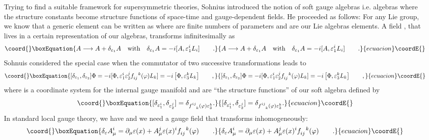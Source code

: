 \documentclass[a4paper,12pt]{book}
\begin{document}
Trying to find a suitable framework for supersymmetric theories, Sohnius
introduced the notion of soft gauge algebras i.e. algebras where the
structure constants become structure functions of space-time and
gauge-dependent fields. He proceeded as follows: For any Lie group, we know
that a generic element can be written as \coordHE{} where 
\myHighlight{$\varepsilon $}\coordHE{} are finite numbers of parameters and \coordHE{} are our Lie
algebras elements. A field \coordHE{}, that lives in a certain representation of
our algebras, transforms infinitesimally as 
\begin{equation}\coord{}\boxEquation{
A\longrightarrow A+\delta _{\varepsilon _{1}}A\quad \mbox{with}\quad \delta
_{\varepsilon _{1}}A=-i[A,\varepsilon _{1}^{i}L_{i}]\qquad .
}{
A\longrightarrow A+\delta _{\varepsilon _{1}}A\quad \mbox{with}\quad \delta
_{\varepsilon _{1}}A=-i[A,\varepsilon _{1}^{i}L_{i}]\qquad .
}{ecuacion}\coordE{}\end{equation}
Sohnuis considered the special case when the commutator of two successive
transformations leads to 
\begin{equation}\coord{}\boxEquation{
\lbrack \delta _{\varepsilon _{1}},\delta _{\varepsilon _{2}}]\Phi =-i[\Phi
,\varepsilon _{1}^{i}\varepsilon _{2}^{j}f_{ij}^{\ \ k}(\varphi
)L_{k}]=-i\left[ \Phi ,\varepsilon _{3}^{k}L_{k}\right] \qquad ,
}{
\lbrack \delta _{\varepsilon _{1}},\delta _{\varepsilon _{2}}]\Phi =-i[\Phi
,\varepsilon _{1}^{i}\varepsilon _{2}^{j}f_{ij}^{\ \ k}(\varphi
)L_{k}]=-i\left[ \Phi ,\varepsilon _{3}^{k}L_{k}\right] \qquad ,
}{ecuacion}\coordE{}\end{equation}
where \myHighlight{$\varphi $}\coordHE{} is a coordinate system for the internal gauge manifold and \coordHE{} are ``the structure functions'' of our soft
algebra defined by 
\begin{equation}\coord{}\boxEquation{
\lbrack \delta _{\varepsilon _{1}^{i}},\delta _{\varepsilon
_{2}^{j}}]=\delta _{f_{\ \ k}^{ij}(\varphi )\varepsilon _{3}^{k}}.
}{
\lbrack \delta _{\varepsilon _{1}^{i}},\delta _{\varepsilon
_{2}^{j}}]=\delta _{f_{\ \ k}^{ij}(\varphi )\varepsilon _{3}^{k}}.
}{ecuacion}\coordE{}\end{equation}
In standard local gauge theory, we have \coordHE{} and we need a
gauge field that transforms inhomogeneously: 
\begin{equation}\coord{}\boxEquation{
\delta _{\varepsilon }A_{\mu }^{i}=\partial _{\mu }\varepsilon (x)+A_{\mu
}^{j}\varepsilon (x)^{i}f_{ij}^{\ \ k}(\varphi )\qquad .
}{
\delta _{\varepsilon }A_{\mu }^{i}=\partial _{\mu }\varepsilon (x)+A_{\mu
}^{j}\varepsilon (x)^{i}f_{ij}^{\ \ k}(\varphi )\qquad .
}{ecuacion}\coordE{}\end{equation}
\end{document}
